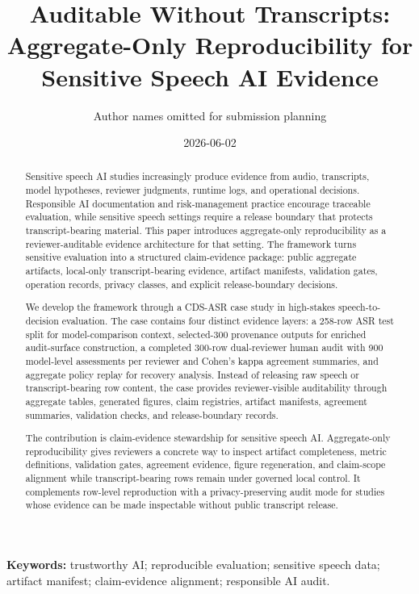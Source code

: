\documentclass[11pt]{article}
\title{Auditable Without Transcripts: Aggregate-Only Reproducibility for Sensitive Speech AI Evidence}
\author{Author names omitted for submission planning}
\date{2026-06-02}
\begin{document}
\sloppy
\maketitle

\begin{abstract}
Sensitive speech AI studies increasingly produce evidence from audio, transcripts, model hypotheses, reviewer judgments, runtime logs, and operational decisions. Responsible AI documentation and risk-management practice encourage traceable evaluation, while sensitive speech settings require a release boundary that protects transcript-bearing material. This paper introduces aggregate-only reproducibility as a reviewer-auditable evidence architecture for that setting. The framework turns sensitive evaluation into a structured claim-evidence package: public aggregate artifacts, local-only transcript-bearing evidence, artifact manifests, validation gates, operation records, privacy classes, and explicit release-boundary decisions.

We develop the framework through a CDS-ASR case study in high-stakes speech-to-decision evaluation. The case contains four distinct evidence layers: a 258-row ASR test split for model-comparison context, selected-300 provenance outputs for enriched audit-surface construction, a completed 300-row dual-reviewer human audit with 900 model-level assessments per reviewer and Cohen's kappa agreement summaries, and aggregate policy replay for recovery analysis. Instead of releasing raw speech or transcript-bearing row content, the case provides reviewer-visible auditability through aggregate tables, generated figures, claim registries, artifact manifests, agreement summaries, validation checks, and release-boundary records.

The contribution is claim-evidence stewardship for sensitive speech AI. Aggregate-only reproducibility gives reviewers a concrete way to inspect artifact completeness, metric definitions, validation gates, agreement evidence, figure regeneration, and claim-scope alignment while transcript-bearing rows remain under governed local control. It complements row-level reproduction with a privacy-preserving audit mode for studies whose evidence can be made inspectable without public transcript release.
\end{abstract}

\noindent\textbf{Keywords:} trustworthy AI; reproducible evaluation; sensitive speech data; artifact manifest; claim-evidence alignment; responsible AI audit.













\end{document}
